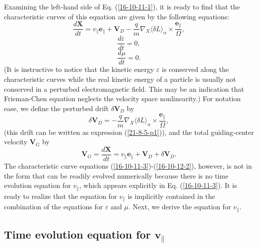 \documentclass{llncs}
\begin{document}
Examining the left-hand side of Eq. (\ref{16-10-11-1}), it is ready to find
that the characteristic curves of this equation are given by the following
equations:
\begin{equation}
  \label{16-10-11-3} \frac{d\mathbf{X}}{d t} = v_{\parallel}
  \mathbf{e}_{\parallel} +\mathbf{V}_D - \frac{q}{m} \nabla_X \langle \delta L
  \rangle_{\alpha} \times \frac{\mathbf{e}_{\parallel}}{\Omega},
\end{equation}
\begin{equation}
  \label{16-10-12-1} \frac{d \varepsilon}{d t} = 0,
\end{equation}
\begin{equation}
  \label{16-10-12-2} \frac{d \mu}{d t} = 0.
\end{equation}
(It is instructive to notice that the kinetic energy $\varepsilon$ is
conserved along the characteristic curves while the real kinetic energy of a
particle is usually not conserved in a perturbed electromagnetic field. This
may be an indication that Frieman-Chen equation neglects the velocity space
nonlinearity.) For notation ease, we define the perturbed drift $\delta
\mathbf{V}_D$ by
\begin{equation}
  \label{19-1-3-1} \delta \mathbf{V}_D = - \frac{q}{m} \nabla_X \langle \delta
  L \rangle_{\alpha} \times \frac{\mathbf{e}_{\parallel}}{\Omega},
\end{equation}
(this drift can be written as expression (\ref{21-8-5-p1})), and the total
guiding-center velocity $\mathbf{V}_G$ by
\begin{equation}
  \mathbf{V}_G = \frac{d\mathbf{X}}{d t} = v_{\parallel}
  \mathbf{e}_{\parallel} +\mathbf{V}_D + \delta \mathbf{V}_D .
\end{equation}
The characteristic curve equations (\ref{16-10-11-3})-(\ref{16-10-12-2}),
however, is not in the form that can be readily evolved numerically because
there is no time evolution equation for $v_{\parallel}$, which appears
explicitly in Eq. (\ref{16-10-11-3}). It is ready to realize that the equation
for $v_{\parallel}$ is implicitly contained in the combination of the
equations for $\varepsilon$ and $\mu$. Next, we derive the equation for
$v_{\parallel}$.

\subsection{Time evolution equation for $\mathbf{v}_{\parallel}$}
\end{document}
